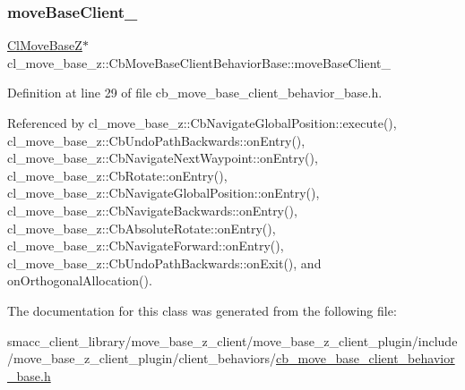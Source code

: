 \subsubsection{\texorpdfstring{move\+Base\+Client\+\_\+}{moveBaseClient\_}}
{\footnotesize\ttfamily \hyperlink{classcl__move__base__z_1_1ClMoveBaseZ}{Cl\+Move\+BaseZ}$\ast$ cl\+\_\+move\+\_\+base\+\_\+z\+::\+Cb\+Move\+Base\+Client\+Behavior\+Base\+::move\+Base\+Client\+\_\+\hspace{0.3cm}{\ttfamily [protected]}}



Definition at line 29 of file cb\+\_\+move\+\_\+base\+\_\+client\+\_\+behavior\+\_\+base.\+h.



Referenced by cl\+\_\+move\+\_\+base\+\_\+z\+::\+Cb\+Navigate\+Global\+Position\+::execute(), cl\+\_\+move\+\_\+base\+\_\+z\+::\+Cb\+Undo\+Path\+Backwards\+::on\+Entry(), cl\+\_\+move\+\_\+base\+\_\+z\+::\+Cb\+Navigate\+Next\+Waypoint\+::on\+Entry(), cl\+\_\+move\+\_\+base\+\_\+z\+::\+Cb\+Rotate\+::on\+Entry(), cl\+\_\+move\+\_\+base\+\_\+z\+::\+Cb\+Navigate\+Global\+Position\+::on\+Entry(), cl\+\_\+move\+\_\+base\+\_\+z\+::\+Cb\+Navigate\+Backwards\+::on\+Entry(), cl\+\_\+move\+\_\+base\+\_\+z\+::\+Cb\+Absolute\+Rotate\+::on\+Entry(), cl\+\_\+move\+\_\+base\+\_\+z\+::\+Cb\+Navigate\+Forward\+::on\+Entry(), cl\+\_\+move\+\_\+base\+\_\+z\+::\+Cb\+Undo\+Path\+Backwards\+::on\+Exit(), and on\+Orthogonal\+Allocation().



The documentation for this class was generated from the following file\+:\begin{DoxyCompactItemize}
\item 
smacc\+\_\+client\+\_\+library/move\+\_\+base\+\_\+z\+\_\+client/move\+\_\+base\+\_\+z\+\_\+client\+\_\+plugin/include/move\+\_\+base\+\_\+z\+\_\+client\+\_\+plugin/client\+\_\+behaviors/\hyperlink{cb__move__base__client__behavior__base_8h}{cb\+\_\+move\+\_\+base\+\_\+client\+\_\+behavior\+\_\+base.\+h}\end{DoxyCompactItemize}
